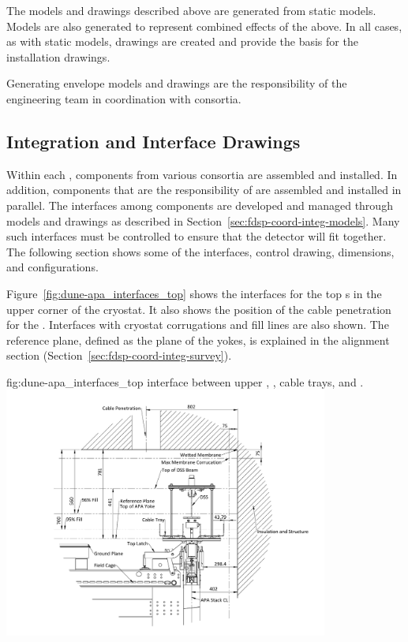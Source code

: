 The models and drawings described above are generated from static
models. Models are also generated to represent combined effects of the
above. In all cases, as with static models, \twod drawings are created
and provide the basis for the installation drawings.


Generating envelope models and drawings are the responsibility of the
 engineering team in coordination with consortia.


\subsection{Integration and Interface Drawings}
\label{sec:fdsp-coord-integ-drawings}

Within each , components from various consortia are
assembled and installed. In addition, components that are the
responsibility of  are assembled and installed in
parallel. The interfaces among components are developed and managed
through models and drawings as described in
Section~\ref{sec:fdsp-coord-integ-models}. Many such interfaces must
be controlled to ensure that the detector will fit together. The
following section shows some of the interfaces, control drawing,
dimensions, and configurations.


Figure~\ref{fig:dune-apa_interfaces_top} shows the interfaces for the
top s in the upper corner of the cryostat. It also shows the position
of the cable penetration for the . Interfaces with cryostat
corrugations and  fill lines are also shown. The reference plane,
defined as the plane of the  yokes, is explained in the
alignment section (Section~\ref{sec:fdsp-coord-integ-survey}).
\begin{dunefigure}{fig:dune-apa_interfaces_top}
  { interface between upper , , cable
    trays, and .}
  \includegraphics[width=0.8\textwidth]{graphics/Interface_upper_apa.pdf}
\end{dunefigure}


